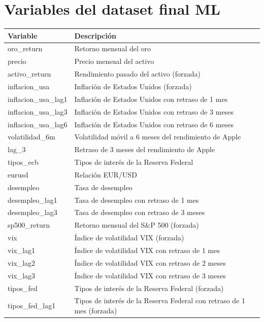 \section{Variables del dataset final ML}
\label{sec:variables_dataset_finalml}
\begin{table}[H]
\centering
\begin{tabular}{|p{5cm}|p{9.5cm}|}
\hline
\textbf{Variable} & \textbf{Descripción} \\
\hline
oro\_return & Retorno mensual del oro \\
\hline
precio & Precio mensual del activo \\
\hline
activo\_return & Rendimiento pasado del activo (forzada) \\
\hline
inflacion\_usa & Inflación de Estados Unidos (forzada) \\
\hline
inflacion\_usa\_lag1 & Inflación de Estados Unidos con retraso de 1 mes \\
\hline
inflacion\_usa\_lag3 & Inflación de Estados Unidos con retraso de 3 meses \\
\hline
inflacion\_usa\_lag6 & Inflación de Estados Unidos con retraso de 6 meses \\
\hline
volatilidad\_6m & Volatilidad móvil a 6 meses del rendimiento de Apple \\
\hline
lag\_3 & Retraso de 3 meses del rendimiento de Apple \\
\hline
tipos\_ecb & Tipos de interés de la Reserva Federal \\
\hline
eurusd & Relación EUR/USD \\
\hline
desempleo & Tasa de desempleo \\
\hline
desempleo\_lag1 & Tasa de desempleo con retraso de 1 mes \\
\hline
desempleo\_lag3 & Tasa de desempleo con retraso de 3 meses \\
\hline
sp500\_return & Retorno mensual del S\&P 500 (forzada) \\
\hline
vix & Índice de volatilidad VIX (forzada) \\
\hline
vix\_lag1 & Índice de volatilidad VIX con retraso de 1 mes \\
\hline
vix\_lag2 & Índice de volatilidad VIX con retraso de 2 meses \\
\hline
vix\_lag3 & Índice de volatilidad VIX con retraso de 3 meses \\
\hline
tipos\_fed & Tipos de interés de la Reserva Federal (forzada) \\
\hline
tipos\_fed\_lag1 & Tipos de interés de la Reserva Federal con retraso de 1 mes (forzada) \\

\end{tabular}
\end{table}
